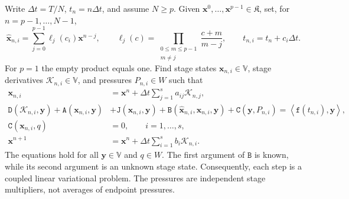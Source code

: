 \documentclass[11pt,a4paper]{article}
\newcommand{\bs}{\boldsymbol}
\newcommand{\dt}{\Delta t}
\newcommand{\V}{\mathbb V}
\newcommand{\DD}{\mathtt D}
\newcommand{\Aform}{\mathtt A}
\newcommand{\JJ}{\mathtt J}
\newcommand{\BB}{\mathtt B}
\newcommand{\CC}{\mathtt C}
\newcommand{\ff}{\mathtt f}
\newcommand{\dual}[2]{\left\langle#1,#2\right\rangle}
\theoremstyle{definition}
\numberwithin{equation}{section}
\begin{document}
Write $\dt=T/N$, $t_n=n\dt$, and assume $N\ge p$. Given
$\bs x^0,\ldots,\bs x^{p-1}\in\mathfrak K$, set, for $n=p-1,\ldots,N-1$,
\begin{equation}\label{eq:ho:predictor}
 \widehat{\bs x}_{n,i}=\sum_{j=0}^{p-1}\ell_j(c_i)\bs x^{n-j},\qquad
 \ell_j(c)=\prod_{\substack{0\le m\le p-1\\m\ne j}}
                    \frac{c+m}{m-j},\qquad t_{n,i}=t_n+c_i \dt.
\end{equation}
For $p=1$ the empty product equals one. Find stage states
$\bs x_{n,i}\in\V$, stage derivatives $\mathcal K_{n,i}\in\V$, and pressures
$P_{n,i}\in W$ such that
\begin{subequations}\label{eq:ho:scheme}
\begin{align}
 \bs x_{n,i}&=\bs x^n+\dt\sum_{j=1}^s a_{ij}\mathcal K_{n,j},
                                      \label{eq:ho:stage}\\
 \DD(\mathcal K_{n,i},\bs y)+\Aform(\bs x_{n,i},\bs y)
 &+\JJ(\bs x_{n,i},\bs y)+\BB(\widehat{\bs x}_{n,i},\bs x_{n,i},\bs y)+\CC(\bs y,P_{n,i})=\dual{\ff(t_{n,i})}{\bs y},
                                      \label{eq:ho:stage-equation}\\
 \CC(\bs x_{n,i},q)&=0,\qquad i=1,\ldots,s,
                                      \label{eq:ho:stage-constraint}\\
 \bs x^{n+1}&=\bs x^n+\dt\sum_{i=1}^s b_i\mathcal K_{n,i}.
                                      \label{eq:ho:update}
\end{align}
\end{subequations}
The equations hold for all $\bs y\in\V$ and $q\in W$. The first argument of
$\BB$ is known, while its second argument is an unknown stage state.
Consequently, each step is a coupled linear variational problem. The pressures
are independent stage multipliers, not averages of endpoint pressures.
\end{document}
